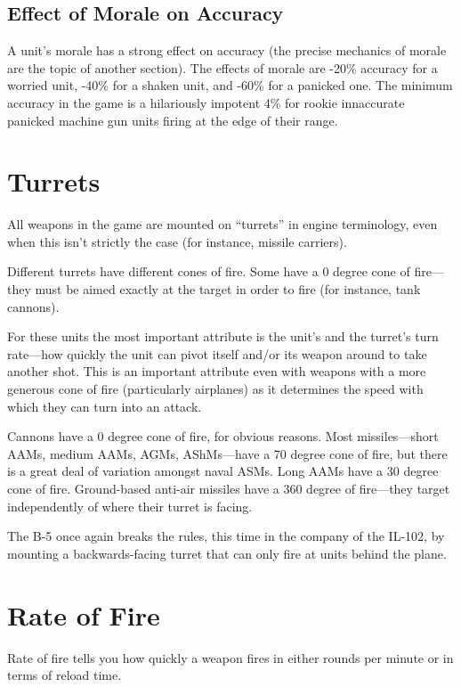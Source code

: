 \documentclass{article}
\begin{document}
\subsection{Effect of Morale on Accuracy}

A unit's morale has a strong effect on accuracy (the precise mechanics of
morale are the topic of another section). The effects of morale are -20\%
accuracy for a worried unit, -40\% for a shaken unit, and -60\% for a panicked
one. The minimum accuracy in the game is a hilariously impotent 4\% for
rookie innaccurate panicked machine gun units firing at the edge of their range.

\section{Turrets}

All weapons in the game are mounted on ``turrets'' in engine terminology, even
when this isn't strictly the case (for instance, missile carriers).

Different turrets have different cones of fire. Some have a 0 degree cone of
fire---they must be aimed exactly at the target in order to fire (for instance,
tank cannons).

For these units the most important attribute is the unit's and the turret's turn
rate---how quickly the unit can pivot itself and/or its weapon around to take
another shot. This is an important attribute even with weapons with a more
generous cone of fire (particularly airplanes) as it determines the speed with
which they can turn into an attack.

Cannons have a 0 degree cone of fire, for obvious reasons. Most
missiles---short AAMs, medium AAMs, AGMs, AShMs---have a 70 degree cone of
fire, but there is a great deal of variation amongst naval
ASMs. Long AAMs have a 30 degree cone of fire. Ground-based anti-air missiles
have a 360 degree of fire---they target independently of where their turret is
facing.

The B-5 once again breaks the rules, this time in the company of the IL-102, by
mounting a backwards-facing turret that can only fire at units behind the plane.

\section{Rate of Fire}

Rate of fire tells you how quickly a weapon fires in either rounds per minute
or in terms of reload time.
\end{document}
